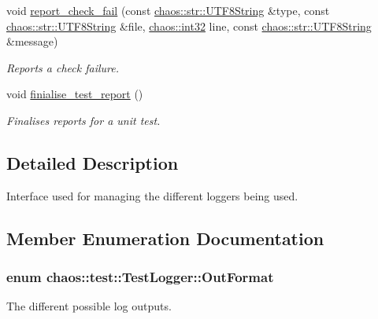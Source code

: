 \begin{DoxyCompactItemize}
void \hyperlink{classchaos_1_1test_1_1_test_logger_acd5a05fdd67072ae8524341cb75c13dc}{report\+\_\+check\+\_\+fail} (const \hyperlink{classchaos_1_1str_1_1_u_t_f8_string}{chaos\+::str\+::\+U\+T\+F8\+String} \&type, const \hyperlink{classchaos_1_1str_1_1_u_t_f8_string}{chaos\+::str\+::\+U\+T\+F8\+String} \&file, \hyperlink{namespacechaos_ad1de7efb430365afd2c9446a0f522a90}{chaos\+::int32} line, const \hyperlink{classchaos_1_1str_1_1_u_t_f8_string}{chaos\+::str\+::\+U\+T\+F8\+String} \&message)
\begin{DoxyCompactList}\small\item\em Reports a check failure. \end{DoxyCompactList}\item 
\hypertarget{classchaos_1_1test_1_1_test_logger_a1969e1ba65fc7971b810eeb42bbc6be3}{}void \hyperlink{classchaos_1_1test_1_1_test_logger_a1969e1ba65fc7971b810eeb42bbc6be3}{finialise\+\_\+test\+\_\+report} ()\label{classchaos_1_1test_1_1_test_logger_a1969e1ba65fc7971b810eeb42bbc6be3}

\begin{DoxyCompactList}\small\item\em Finalises reports for a unit test. \end{DoxyCompactList}\end{DoxyCompactItemize}


\subsection{Detailed Description}
Interface used for managing the different loggers being used. 

\subsection{Member Enumeration Documentation}
\hypertarget{classchaos_1_1test_1_1_test_logger_a8e6f679501d623e41ac0f0c445a7820d}{}
\subsubsection[{Out\+Format}]{\setlength{\rightskip}{0pt plus 5cm}enum {\bf chaos\+::test\+::\+Test\+Logger\+::\+Out\+Format}}\label{classchaos_1_1test_1_1_test_logger_a8e6f679501d623e41ac0f0c445a7820d}


The different possible log outputs. 

